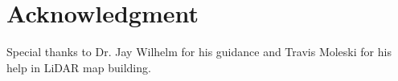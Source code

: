\documentclass[journal,onecolumn]{IEEEtran}
\begin{document}


\justifying
\section*{Acknowledgment}


	{Special thanks to Dr. Jay Wilhelm for his guidance and Travis Moleski for his help in LiDAR map building.}


\ifCLASSOPTIONcaptionsoff
\newpage
\fi





%
%
%


	  
	 





\end{document}
